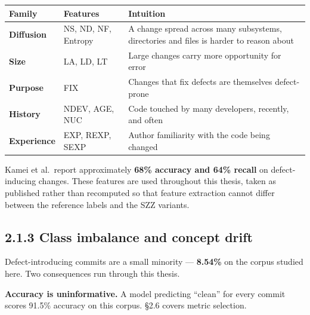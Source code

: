 \begin{longtable}[]{@{}
  >{\raggedright\arraybackslash}p{}
  >{\raggedright\arraybackslash}p{}
  >{\raggedright\arraybackslash}p{}@{}}
\toprule\noalign{}
\begin{minipage}[b]{\linewidth}\raggedright
Family
\end{minipage} & \begin{minipage}[b]{\linewidth}\raggedright
Features
\end{minipage} & \begin{minipage}[b]{\linewidth}\raggedright
Intuition
\end{minipage} \\
\midrule\noalign{}
\endhead
\bottomrule\noalign{}
\endlastfoot
\textbf{Diffusion} & NS, ND, NF, Entropy & A change spread across many
subsystems, directories and files is harder to reason about \\
\textbf{Size} & LA, LD, LT & Large changes carry more opportunity for
error \\
\textbf{Purpose} & FIX & Changes that fix defects are themselves
defect-prone \\
\textbf{History} & NDEV, AGE, NUC & Code touched by many developers,
recently, and often \\
\textbf{Experience} & EXP, REXP, SEXP & Author familiarity with the code
being changed \\
\end{longtable}

Kamei et al.~report approximately \textbf{68\% accuracy and 64\% recall}
on defect-inducing changes. These features are used throughout this
thesis, taken as published rather than recomputed so that feature
extraction cannot differ between the reference labels and the SZZ
variants.

\subsection{2.1.3 Class imbalance and concept
drift}\label{class-imbalance-and-concept-drift}

Defect-introducing commits are a small minority --- \textbf{8.54\%} on
the corpus studied here. Two consequences run through this thesis.

\textbf{Accuracy is uninformative.} A model predicting ``clean'' for
every commit scores 91.5\% accuracy on this corpus. \S{}2.6 covers metric
selection.


